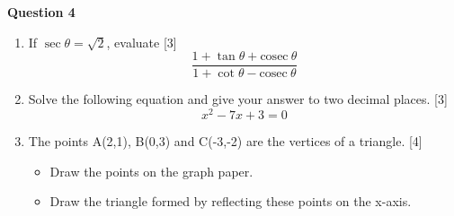 \noindent
\textbf{Question 4}
\begin{enumerate}[label=(\roman*)]

    \item If $\sec \theta = \sqrt{2}$, evaluate \hfill [3]
        \[
            \frac{1 + \tan \theta + \mathrm{cosec} \ \theta}
                 {1 + \cot \theta - \mathrm{cosec} \ \theta}
        \]

    \item Solve the following equation and give your answer to 
        two decimal places. \hfill [3]
        \[
            x^2 - 7x + 3 = 0
        \]

    \item The points A(2,1), B(0,3) and C(-3,-2) are the vertices 
        of a triangle. \hfill [4]
        \begin{itemize}
            \setlength\itemsep{0em}
            \item Draw the points on the graph paper.
            \item Draw the triangle formed by reflecting these points 
                on the x-axis.
        \end{itemize}

\end{enumerate}

